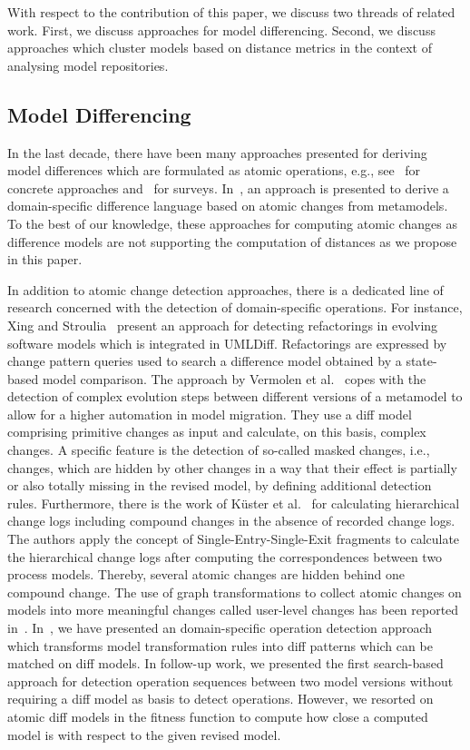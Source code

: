 With respect to the contribution of this paper, we discuss two threads of related work. First, we discuss approaches for model differencing. Second, we discuss approaches which cluster models based on distance metrics in the context of analysing model repositories.

\subsection{Model Differencing} 

In the last decade, there have been many approaches presented for deriving model differences which are formulated as atomic operations, e.g., see~\cite{} for concrete approaches and~\cite{} for surveys. In~\cite{}, an approach is presented to derive a domain-specific difference language based on atomic changes from metamodels. To the best of our knowledge, these approaches for computing atomic changes as difference models are not supporting the computation of distances as we propose in this paper.

In addition to atomic change detection approaches, there is a dedicated line of research concerned with the detection of domain-specific operations. For instance, Xing and Stroulia~\cite{} present an approach for detecting refactorings in evolving software models which is integrated in UMLDiff. Refactorings
are expressed by change pattern queries used to search a
difference model obtained by a state-based model comparison.
The approach by Vermolen et al.~\cite{} copes with the detection
of complex evolution steps between different versions of a
metamodel to allow for a higher automation in model
migration. They use a diff model comprising primitive changes
as input and calculate, on this basis, complex changes. A specific feature is the detection of so-called
masked changes, i.e., changes, which are hidden by other
changes in a way that their effect is partially or also totally
missing in the revised model, by defining additional detection
rules. Furthermore, there is the work of Küster et al.~\cite{} for
calculating hierarchical change logs including compound
changes in the absence of recorded change logs. The authors
apply the concept of Single-Entry-Single-Exit fragments to
calculate the hierarchical change logs after computing the
correspondences between two process models. Thereby,
several atomic changes are hidden behind one compound
change. The use of graph transformations to collect atomic
changes on models into more meaningful changes called user-level
changes has been reported in~\cite{}. In~\cite{}, we have presented an domain-specific operation detection approach which transforms model transformation rules into diff patterns which can be matched on diff models. In follow-up work, we presented the first search-based approach for detection operation sequences between two model versions without requiring a diff model as basis to detect operations. However, we resorted on atomic diff models in the fitness function to compute how close a computed model is with respect to the given revised model.

